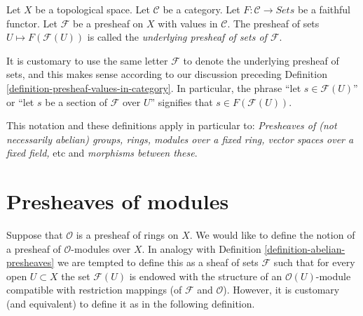 \begin{definition}
\label{definition-underlying-presheaf-sets}
Let $X$ be a topological space. Let $\mathcal{C}$ be a category.
Let $F : \mathcal{C} \to \textit{Sets}$ be a faithful functor.
Let $\mathcal{F}$ be a presheaf on $X$ with values in $\mathcal{C}$.
The presheaf of sets $U \mapsto F(\mathcal{F}(U))$
is called the {\it underlying presheaf of sets of $\mathcal{F}$}.
\end{definition}

\noindent
It is customary to use the same letter $\mathcal{F}$ to denote
the underlying presheaf of sets, and this makes
sense according to our discussion preceding
Definition \ref{definition-presheaf-values-in-category}.
In particular, the phrase ``let $s \in \mathcal{F}(U)$''
or ``let $s$ be a section of $\mathcal{F}$ over $U$'' signifies
that $s \in F(\mathcal{F}(U))$.

\medskip\noindent
This notation and these definitions apply in particular to:
{\it Presheaves of (not necessarily abelian) groups, rings, modules
over a fixed ring, vector spaces over a fixed field, } etc and
{\it morphisms between these}.

\section{Presheaves of modules}
\label{section-presheaves-modules}

\noindent
Suppose that $\mathcal{O}$ is a presheaf of rings on $X$.
We would like to define the notion of a presheaf of
$\mathcal{O}$-modules over $X$. In analogy with Definition
\ref{definition-abelian-presheaves} we are tempted to define
this as a sheaf of sets $\mathcal{F}$ such that for every open
$U \subset X$ the set $\mathcal{F}(U)$ is endowed with the structure
of an $\mathcal{O}(U)$-module compatible with restriction mappings
(of $\mathcal{F}$ and $\mathcal{O}$). However, it is customary
(and equivalent) to define it as in the following definition.

